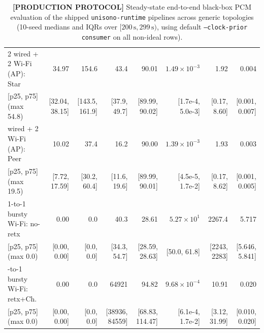 \documentclass[11pt,a4paper]{article}
\theoremstyle{definition}
\begin{document}
\begin{table}[htb]
\begin{tabular}{@{}l r r r r r r r@{}}
\midrule
2 wired + 2 Wi-Fi (AP): Star & 34.97 & 154.6 & 43.4 & 90.01 & $1.49{\times}10^{-3}$ & 1.92 & 0.004 \\[-1pt]
\quad\tiny [p25, p75] (max 54.8) & \tiny [32.04, 38.15] & \tiny [143.5, 161.9] & \tiny [37.9, 49.7] & \tiny [89.99, 90.02] & \tiny [1.7e-4, 5.0e-3] & \tiny [0.17, 8.60] & \tiny [0.001, 0.007] \\
\addlinespace[2pt]
2 wired + 2 Wi-Fi (AP): Peer & 10.02 & 37.4 & 16.2 & 90.00 & $1.39{\times}10^{-3}$ & 1.93 & 0.003 \\[-1pt]
\quad\tiny [p25, p75] (max 19.5) & \tiny [7.72, 17.59] & \tiny [30.2, 60.4] & \tiny [11.6, 19.6] & \tiny [89.99, 90.01] & \tiny [4.5e-5, 1.7e-2] & \tiny [0.17, 8.62] & \tiny [0.001, 0.005] \\
\midrule
1-to-1 bursty Wi-Fi: no-retx & 0.00 & 0.0 & 40.3 & 28.61 & $5.27{\times}10^{1}$ & 2267.4 & 5.717 \\[-1pt]
\quad\tiny [p25, p75] (max 0.0) & \tiny [0.00, 0.00] & \tiny [0.0, 0.0] & \tiny [34.3, 54.7] & \tiny [28.59, 28.63] & \tiny [50.0, 61.8] & \tiny [2243, 2283] & \tiny [5.646, 5.841] \\
\addlinespace[2pt]
1-to-1 bursty Wi-Fi: retx+Ch. & 0.00 & 0.0 & 64921 & 94.82 & $9.68{\times}10^{-4}$ & 10.91 & 0.020 \\[-1pt]
\quad\tiny [p25, p75] (max 0.0) & \tiny [0.00, 0.00] & \tiny [0.0, 0.0] & \tiny [38936, 84559] & \tiny [68.83, 114.47] & \tiny [6.1e-4, 1.7e-2] & \tiny [3.12, 31.99] & \tiny [0.010, 0.020] \\
\bottomrule
\end{tabular}
\caption{\textbf{[PRODUCTION PROTOCOL]} Steady-state end-to-end black-box PCM
evaluation of the shipped \texttt{unisono-runtime} pipelines across generic
topologies (10-seed medians and IQRs over $[200\,\text{s}, 299\,\text{s})$,
using default \texttt{--clock-prior consumer} on all non-ideal rows).}
\label{tab:topo}
\end{table}
\end{document}
